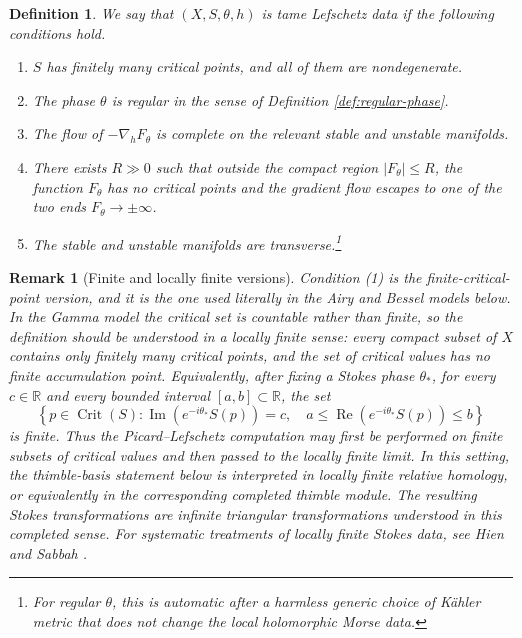 \documentclass[11pt]{amsart}
\theoremstyle{plain}
\newtheorem{defn}[thm]{Definition}
\newtheorem{rmk}[thm]{Remark}
\newcommand{\R}{\mathbb R}
\newcommand{\Crit}{\operatorname{Crit}}
\begin{document}
\begin{defn}\label{def:tame-data}
We say that $(X,S,\theta,h)$ is tame Lefschetz data if the following conditions hold.
\begin{enumerate}[label=\textup{(\arabic*)}, leftmargin=2.5em]
\item $S$ has finitely many critical points, and all of them are nondegenerate.
\item The phase $\theta$ is regular in the sense of Definition \ref{def:regular-phase}.
\item The flow of $-\nabla_hF_{\theta}$ is complete on the relevant stable and unstable manifolds.
\item There exists $R\gg 0$ such that outside the compact region $|F_{\theta}|\le R$, the function $F_{\theta}$ has no critical points and the gradient flow escapes to one of the two ends $F_{\theta}\to\pm\infty$.
\item The stable and unstable manifolds are transverse.\footnote{For regular $\theta$, this is automatic after a harmless generic choice of K\"ahler metric that does not change the local holomorphic Morse data.}
\end{enumerate}
\end{defn}

\begin{rmk}[Finite and locally finite versions]
Condition \textup{(1)} is the finite-critical-point version, and it is the one
used literally in the Airy and Bessel models below.  In the Gamma model the
critical set is countable rather than finite, so the definition should be
understood in a locally finite sense: every compact subset of \(X\) contains
only finitely many critical points, and the set of critical values has no
finite accumulation point.
Equivalently, after fixing a Stokes phase \(\theta_*\), for every
\(c\in\R\) and every bounded interval \([a,b]\subset\R\), the set
\[
\left\{
p\in\Crit(S):
\operatorname{Im}\!\left(e^{-i\theta_*}S(p)\right)=c,\quad
a\le
\operatorname{Re}\!\left(e^{-i\theta_*}S(p)\right)
\le b
\right\}
\]
is finite.  Thus the Picard--Lefschetz computation may first be performed
on finite subsets of critical values and then passed to the locally finite
limit.
In this setting, the thimble-basis statement below is interpreted in locally
finite relative homology, or equivalently in the corresponding completed
thimble module.  The resulting Stokes transformations are infinite triangular
transformations understood in this completed sense.  For systematic treatments
of locally finite Stokes data, see Hien \cite{Hien2009} and Sabbah
\cite{Sabbah2013}.
\end{rmk}
\end{document}
